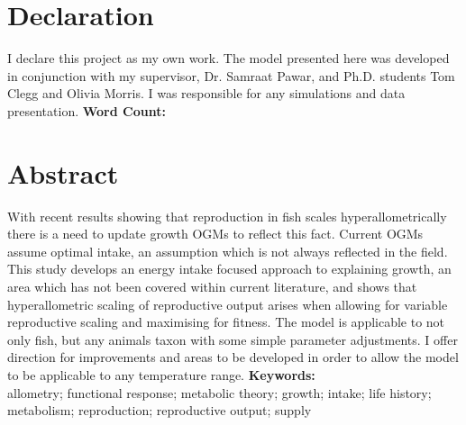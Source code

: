 \documentclass[a4paper, 11pt, hidelinks]{article} %
\newcommand\wordcount{} %
\begin{document}
	
	

	\section*{Declaration}
	I declare this project as my own work.  The model presented here was developed in conjunction with my supervisor, Dr. Samraat Pawar, and Ph.D. students Tom Clegg and Olivia Morris.  I was responsible for any simulations and data presentation.\newline
	\textbf{Word Count: \wordcount}

	\newpage
	
	\section*{Abstract}
	\linenumbers
	 
	With recent results showing that reproduction in fish scales hyperallometrically there is a need to update growth OGMs to reflect this fact.  Current OGMs assume optimal intake, an assumption which is not always reflected in the field.  This study develops an energy intake focused approach to explaining growth, an area which has not been covered within current literature, and shows that hyperallometric scaling of reproductive output arises when allowing for variable reproductive scaling and maximising for fitness.  The model is applicable to not only fish, but any animals taxon with some simple parameter adjustments.  I offer direction for improvements and areas to be developed in order to allow the model to be applicable to any temperature range.
	\vspace*{0.5 cm}
	\newline
%	
	\textbf{Keywords:}\\
	allometry; functional response; metabolic theory; growth; intake; life history; metabolism; reproduction; reproductive output; supply

	
	
	\nolinenumbers
	
	
\end{document}
